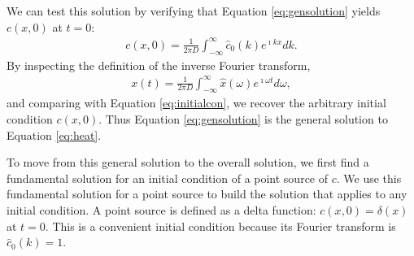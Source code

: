 \documentclass[draft, jgrga]{AGUTeX}
\begin{document}
\begin{article}
We can test this solution by verifying that Equation \ref{eq:gensolution} yields $c(x,0)$ at $t=0$:
\begin{eqnarray}
  \label{eq:initialcon}
c(x,0) = \frac{1}{2 \pi D} \int^\infty_{-\infty} \hat{c}_0 (k) e^{\imath kx} dk. \nonumber
\end{eqnarray}
By inspecting the definition of the inverse Fourier transform,
\begin{eqnarray}
  \label{eq:invFT}
x(t) = \frac{1}{2 \pi D} \int^\infty_{-\infty} \hat{x} (\omega) e^{\imath \omega t} d\omega, \nonumber
\end{eqnarray}
and comparing with Equation \ref{eq:initialcon}, we recover the arbitrary initial condition $c(x,0)$. Thus Equation \ref{eq:gensolution} is the general solution to Equation \ref{eq:heat}.

To move from this general solution to the overall solution, we first find a fundamental solution for an initial condition of a point source of $c$. We use this fundamental solution for a point source to build the solution that applies to any initial condition. A point source is defined as a delta function: $c(x,0) = \delta (x)$ at $t=0$. This is a convenient initial condition because its Fourier transform is $\hat{c}_0 (k) = 1$.


\end{article}
\end{document}
